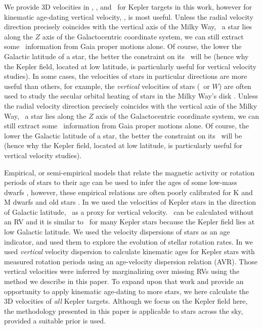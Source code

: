 We provide 3D velocities in \vx, \vy, and \vz\ for Kepler targets in this
work, however for kinematic age-dating vertical velocity, \vz, is most useful.
Unless the radial velocity direction precisely coincides with the vertical
axis of the Milky Way, \ie\ a star lies along the $Z$ axis of the
Galactocentric coordinate system, we can still extract some \vz\ information
from Gaia proper motions alone.
Of course, the lower the Galactic latitude of a star, the better the
constraint on its \vz\ will be (hence why the Kepler field, located at low
latitude, is particularly useful for vertical velocity studies).
In some cases, the velocities of stars in particular directions are more
useful than others, for example, the {\it vertical} velocities of stars (\vz\
or $W$) are often used to study the secular orbital heating of stars in the
Milky Way's disk \citep[\eg][]{beane2018, yu2018, ting2019, mackereth2019}.
Unless the radial velocity direction precisely coincides with the vertical
axis of the Milky Way, \ie\ a star lies along the $Z$ axis of the
Galactocentric coordinate system, we can still extract some \vz\ information
from Gaia proper motions alone.
Of course, the lower the Galactic latitude of a star, the better the
constraint on its \vz\ will be (hence why the Kepler field, located at low
latitude, is particularly useful for vertical velocity studies).

Empirical, or semi-empirical models that relate the magnetic activity or
rotation periods of stars to their age can be used to infer the ages of some
low-mass dwarfs \citep[\eg][]{skumanich1972, barnes2003, barnes2007,
mamajek2008, matt2015, angus2019, claytor2020},
however, these empirical relations are often poorly calibrated for K and M
dwarfs and old stars \citep[\eg][]{angus2015, vansaders2016, vansaders2018,
metcalfe2019, curtis2020, spada2019, angus2020}.
In \citet{angus2020} we used the velocities of Kepler stars in the direction
of Galactic latitude, \vb\, as a proxy for vertical velocity.
\vb\ can be calculated without an RV and it is similar to \vz\ for many Kepler
stars because the Kepler field lies at low Galactic latitude.
We used the velocity dispersions of stars as an age indicator, and used them
to explore the evolution of stellar rotation rates.
In \citet{lu2021} we used {\it vertical} velocity dispersion to calculate
kinematic ages for Kepler stars with measured rotation periods using an
age-velocity dispersion relation (AVR).
Those vertical velocities were inferred by marginalizing over missing RVs
using the method we describe in this paper.
To expand upon that work and provide an opportunity to apply kinematic
age-dating to more stars, we here calculate the 3D velocities of {\it all}
Kepler targets.
Although we focus on the Kepler field here, the methodology presented in this
paper is applicable to stars across the sky, provided a suitable prior is
used.

